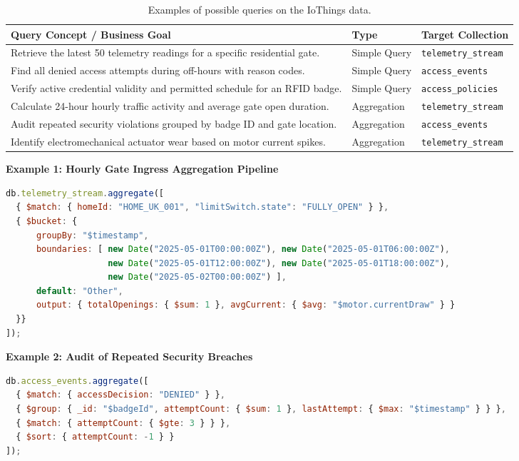 \documentclass[11pt,a4paper]{article}
\begin{document}
\begin{table}[htbp]
\centering
\small
\caption{Examples of possible queries on the IoThings data.}
\label{tab:query_catalog}
\renewcommand{\arraystretch}{1.2}
\begin{tabularx}{\linewidth}{p{7.5cm} l X}
\toprule
\textbf{Query Concept / Business Goal} & \textbf{Type} & \textbf{Target Collection} \\
\midrule
Retrieve the latest 50 telemetry readings for a specific residential gate. & Simple Query & \texttt{telemetry\_stream} \\
\addlinespace
Find all denied access attempts during off-hours with reason codes. & Simple Query & \texttt{access\_events} \\
\addlinespace
Verify active credential validity and permitted schedule for an RFID badge. & Simple Query & \texttt{access\_policies} \\
\addlinespace
Calculate 24-hour hourly traffic activity and average gate open duration. & Aggregation & \texttt{telemetry\_stream} \\
\addlinespace
Audit repeated security violations grouped by badge ID and gate location. & Aggregation & \texttt{access\_events} \\
\addlinespace
Identify electromechanical actuator wear based on motor current spikes. & Aggregation & \texttt{telemetry\_stream} \\
\bottomrule
\end{tabularx}
\end{table}

\noindent \textbf{Example 1: Hourly Gate Ingress Aggregation Pipeline}
\begin{lstlisting}[language=JavaScript]
db.telemetry_stream.aggregate([
  { $match: { homeId: "HOME_UK_001", "limitSwitch.state": "FULLY_OPEN" } },
  { $bucket: {
      groupBy: "$timestamp",
      boundaries: [ new Date("2025-05-01T00:00:00Z"), new Date("2025-05-01T06:00:00Z"),
                    new Date("2025-05-01T12:00:00Z"), new Date("2025-05-01T18:00:00Z"),
                    new Date("2025-05-02T00:00:00Z") ],
      default: "Other",
      output: { totalOpenings: { $sum: 1 }, avgCurrent: { $avg: "$motor.currentDraw" } }
  }}
]);
\end{lstlisting}

\noindent \textbf{Example 2: Audit of Repeated Security Breaches}
\begin{lstlisting}[language=JavaScript]
db.access_events.aggregate([
  { $match: { accessDecision: "DENIED" } },
  { $group: { _id: "$badgeId", attemptCount: { $sum: 1 }, lastAttempt: { $max: "$timestamp" } } },
  { $match: { attemptCount: { $gte: 3 } } },
  { $sort: { attemptCount: -1 } }
]);
\end{lstlisting}
\end{document}

